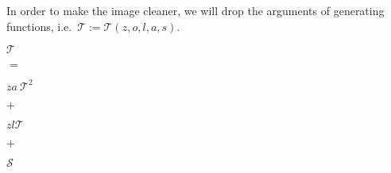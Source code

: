 \documentclass[final]{article}
\theoremstyle{definition}
\theoremstyle{definition}
\theoremstyle{remark}
\newcommand{\gf}[1]{\ensuremath{\mathcal{#1}}}
\begin{document}
In order to make the image cleaner, we will drop the arguments of generating functions, i.e.~\(\gf{T} := \gf{T}(z, o, l, a, s)\).


\begin{center}
    \begin{minipage}[t]{.2\textwidth}
        \begin{center}
            \(\gf{T}\)\\
        \end{center}
    \end{minipage}%
    \begin{minipage}[t]{.05\textwidth}
        \begin{center}
            \(=\)\\
        \end{center}
    \end{minipage}%
    \begin{minipage}[t]{.2\textwidth}
        \begin{center}
            \(z a~\gf{T}^2\)\\
        \end{center}
    \end{minipage}%
    \begin{minipage}[t]{.05\textwidth}
        \begin{center}
            \(+\)\\
        \end{center}
    \end{minipage}%
    \begin{minipage}[t]{.2\textwidth}
        \begin{center}
            \(z l \gf{T}\)\\
        \end{center}
    \end{minipage}%
    \begin{minipage}[t]{.05\textwidth}
        \begin{center}
            \(+\)\\
        \end{center}
    \end{minipage}%
    \begin{minipage}[t]{.2\textwidth}
        \begin{center}
            \(\gf{S}\)\\
        \end{center}
    \end{minipage}%
\end{center}
\end{document}
